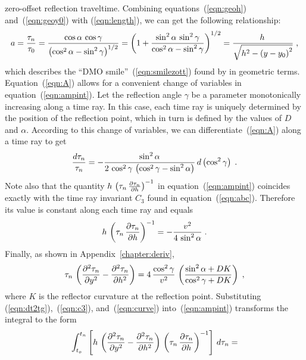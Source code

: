 zero-offset reflection traveltime. Combining
equations~(\ref{eqn:geoh}) and~(\ref{eqn:geoy0}) with
(\ref{eqn:length}), we can get the following relationship:
\begin{equation}
a={\tau_n\over\tau_0}={{\cos{\alpha}\,\cos{\gamma}}\over
\left(\cos^2{\alpha}-\sin^2{\gamma}\right)^{1/2}}=
\left(1+{{\sin^2{\alpha}\,\sin^2{\gamma}}\over
{\cos^2{\alpha}-\sin^2{\gamma}}}\right)^{1/2}=
{h\,\over\sqrt{h^2-\left(y-y_0\right)^2}}\;,
\label{eqn:A}
\end{equation}
which describes the ``DMO smile''~(\ref{eqn:smilezott}) found by
\cite{GPR29-03-03740406} in geometric terms.
Equation~(\ref{eqn:A}) allows for a convenient change of variables
in equation~(\ref{eqn:ampint}). Let the reflection angle $\gamma$ be a
parameter monotonically increasing along a time ray. In this case,
each time ray is uniquely determined by the position of the reflection
point, which in turn is defined by the values of $D$ and $\alpha$.
According to this change of variables, we can
differentiate~(\ref{eqn:A}) along a time ray to get
\begin{equation}
{{d\tau_n}\over\tau_n}=-{{\sin^2{\alpha}}\over
{2\,\cos^2{\gamma}\,\left(\cos^2{\gamma}-\sin^2{\alpha}\right)}}\,
d\left(\cos^2{\gamma}\right)\;.
\label{eqn:dt2tg}
\end{equation}
Note also that the quantity $h\,\left(\tau_n\,{\partial \tau_n \over
    \partial h} \right)^{-1}$ in equation~(\ref{eqn:ampint}) coincides
exactly with the time ray invariant $C_3$ found in
equation~(\ref{eqn:abc}). Therefore its value is constant along each
time ray and equals
\begin{equation}
h\,\left(\tau_n\,{\partial \tau_n \over \partial h}\right)^{-1}=
-{v^2 \over 4\, \sin^2{\alpha}}\;.
\label{eqn:c3}
\end{equation}
Finally, as shown in Appendix~\ref{chapter:deriv},
\begin{equation}
\tau_n\,\left({\partial^2 \tau_n \over \partial y^2}-
{\partial^2 \tau_n \over \partial h^2}\right)=4\,
{\cos^2{\gamma}\over v^2}\,\left({\sin^2{\alpha}+DK}\over
{\cos^2{\gamma}+DK}\right)\;,
\label{eqn:curve}
\end{equation}
where $K$ is the reflector curvature at the reflection point.
Substituting (\ref{eqn:dt2tg}),~(\ref{eqn:c3}), and~(\ref{eqn:curve})
into~(\ref{eqn:ampint}) transforms the integral to the form
\begin{eqnarray*}
 \int_{t_o}^{t_n}\left[
h\,\left({\partial^2 \tau_n \over \partial y^2}-
{\partial^2 \tau_n \over \partial h^2}\right)\,
\left(\tau_n\,{\partial \tau_n \over \partial h} \right)^{-1}\right]\,
d\tau_n = 
\end{eqnarray*}
